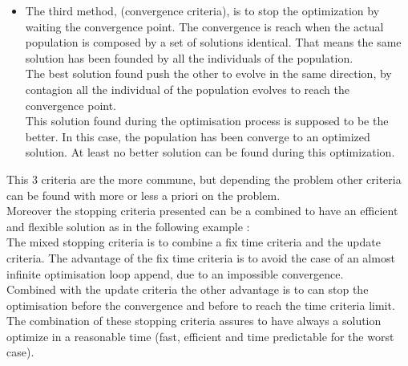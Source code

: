 \begin{itemize}
\item The third method, (convergence criteria), is to stop the optimization by waiting the convergence point. The convergence is reach when the actual population is composed by a set of solutions identical. That means the same solution has been founded by all the individuals of the population. \\
 The best solution found  push the other to evolve in the same  direction, by contagion  all the individual  of the population evolves to reach the convergence point. \\ 
 This solution found during the optimisation process is supposed to be the better. In this case, the population has been converge to an optimized solution. At least no better solution can be found during this optimization.\\
\end{itemize}
This 3 criteria are the more commune, but depending the problem other criteria can be found with more or less a priori on the problem.\\

 Moreover the stopping criteria presented can be a combined to have an efficient and flexible solution as  in the following example :\\
The mixed stopping criteria is to combine a fix time criteria and the update criteria.
The advantage of the fix time criteria is to avoid the case of an almost infinite optimisation loop append, due to an impossible convergence.%
\\ %
Combined with the update criteria the other advantage is to can stop the optimisation before the convergence and before to reach the time criteria limit.\\
The combination of these stopping criteria assures to have always a solution optimize in a reasonable time (fast, efficient and time predictable for the worst case). 

 
%



